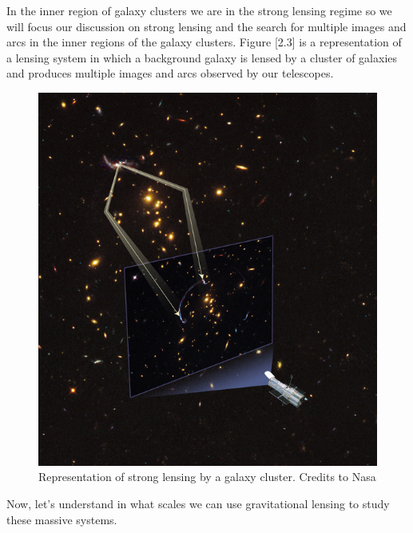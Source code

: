 In the inner region of galaxy clusters we are in the strong lensing regime so we will focus our discussion on strong lensing and the search for multiple images and arcs in the inner regions of the galaxy clusters. Figure [2.3] is a representation of a lensing system in which a background galaxy is lensed by a cluster of galaxies and produces multiple images and arcs observed by our telescopes. 

\begin{figure}[H]
\centering
\includegraphics[width=12cm]{images/lensing.jpg}
\caption[Strong Lensing representation]{Representation of strong lensing by a galaxy cluster. Credits to Nasa}
\end{figure}

Now, let's understand in what scales we can use gravitational lensing to study these massive systems.